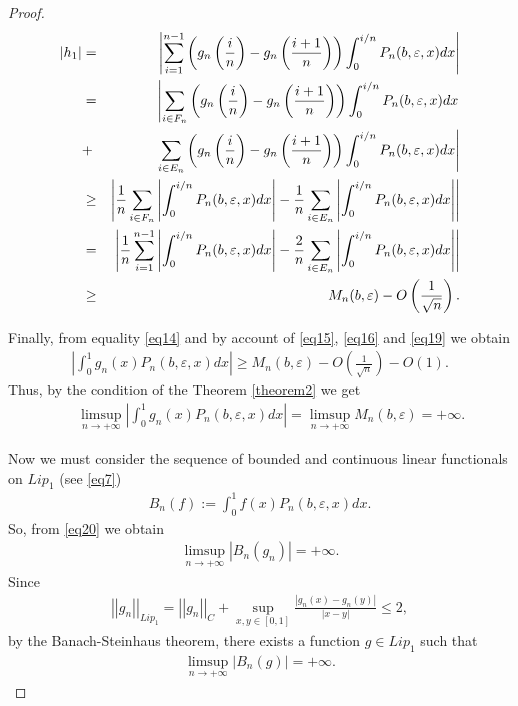 \documentclass{publmathdeb}
\begin{document}
\begin{proof}
		\begin{eqnarray}
			\label{eq19} \left|h_1\right| &=& \left| \sum_{i=1}^{n-1}\left(g_n\left(\frac{i}{n}\right)-g_n\left(\frac{i+1}{n}\right)\right)\int_{0}^{i/n}P_n(b, \varepsilon, x)dx  \right| \notag \\
			&=&  \left|\sum_{i\in F_n} \left(g_n \left(\frac{i}{n}\right) -g_n \left(\frac{i+1}{n}\right)\right)\int_{0}^{i/n}  P_n(b, \varepsilon,x)dx\right.  \\
			&+& \left.\sum_{i\in E_n} \left(g_n \left(\frac{i}{n}\right) -g_n \left(\frac{i+1}{n}\right)\right)\int_{0}^{i/n}  P_n(b, \varepsilon,x)dx\right| \notag \\
			&\geq& \left|\frac{1}{n} \sum_{i\in F_n} \left|\int_{0}^{i/n}  P_n(b, \varepsilon,x)dx\right| - \frac{1}{n} \sum_{i\in E_n} \left|\int_{0}^{i/n}  P_n(b, \varepsilon,x)dx\right| \right| \notag\\
			&=& \left|\frac{1}{n} \sum_{i=1}^{n-1} \left|\int_{0}^{i/n}  P_n(b, \varepsilon,x)dx\right| - \frac{2}{n} \sum_{i\in E_n} \left|\int_{0}^{i/n}  P_n(b, \varepsilon,x)dx\right| \right|  \notag \\
			&\geq& M_n(b,\varepsilon) - O\left(\frac{1}{\sqrt{n}}\right).\notag
		\end{eqnarray}
		
		Finally, from equality \eqref{eq14} and by account of \eqref{eq15}, \eqref{eq16} and \eqref{eq19} we obtain
		\begin{eqnarray*}
			\left|\int_{0}^{1} g_n(x) P_n(b, \varepsilon,x)dx\right| \geq M_n(b,\varepsilon) - O\left(\frac{1}{\sqrt{n}}\right)-O(1).
		\end{eqnarray*}
		Thus, by the condition of the Theorem \ref{theorem2} we get
		\begin{eqnarray} \label{eq20}
			&&\limsup_{n \rightarrow +\infty}\left|\int_{0}^{1} g_n(x) P_n(b, \varepsilon,x)dx\right| = \limsup_{n \rightarrow +\infty} M_n(b,\varepsilon) =+\infty. 
		\end{eqnarray}
		
		Now we must consider the sequence of bounded and continuous linear functionals on $Lip_1$ (see \eqref{eq7})
		\begin{eqnarray*}
			B_n(f):= \int_{0}^{1} f(x)  P_n(b, \varepsilon,x)dx.
		\end{eqnarray*}
		So, from \eqref{eq20} we obtain
		\begin{eqnarray*}
			\limsup_{n \rightarrow +\infty}\left|B_n \left(g_n\right)\right| =+ \infty.
		\end{eqnarray*}
		Since
		\begin{eqnarray*}
			\left|\left|g_n\right|\right|_{Lip_1} = 	\left|\left|g_n\right|\right|_C +\sup_{x,y \in \left[0,1\right]}  \frac{\left|g_n(x)-g_n(y)\right|}{\left|x-y\right|} \leq 2,
		\end{eqnarray*}
		by the Banach-Steinhaus theorem, there exists a function $g\in Lip_1$ such that
		\begin{eqnarray*}
			\limsup_{n \rightarrow +\infty}\left|B_n \left(g\right)\right| =+ \infty.
		\end{eqnarray*}
		

\end{proof}
\end{document}
